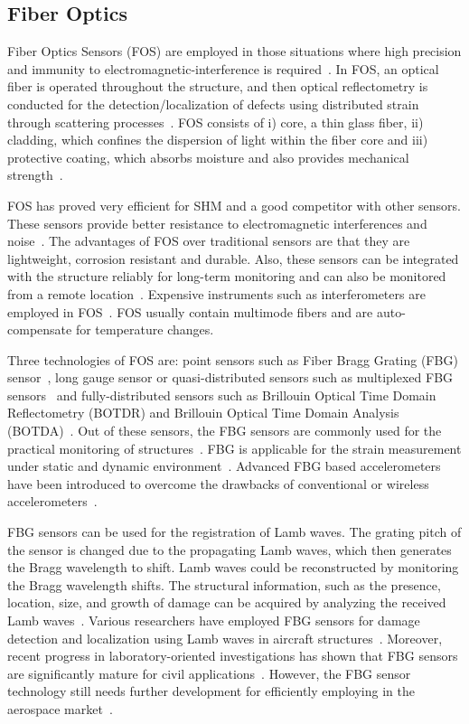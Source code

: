 \documentclass[b5paper, 11pt, titlepage]{book}
\begin{document}
\subsection{Fiber Optics}
Fiber Optics Sensors (FOS) are employed in those situations where high precision and immunity to electromagnetic-interference is required~\cite{li2018fiber}. In FOS, an optical fiber is operated throughout the structure, and then optical reflectometry is conducted for the detection/localization of defects using distributed strain through scattering processes~\cite{warsi2019sensors}. 
FOS consists of i) core, a thin glass fiber, ii) cladding, which confines the dispersion of light within the fiber core and iii) protective coating, which absorbs moisture and also provides mechanical strength~\cite{Torres2011}.

FOS has proved very efficient for SHM and a good competitor with other sensors. These sensors provide better resistance to electromagnetic interferences and noise~\cite{Das2018}. The advantages of FOS over traditional sensors are that they are lightweight, corrosion resistant and durable. Also, these sensors can be integrated with the structure reliably for long-term monitoring and can also be monitored from a remote location~\cite{casas2003fiber, Majumder2008}. Expensive instruments such as interferometers are employed in FOS~\cite{warsi2019sensors}. FOS usually contain multimode fibers and are auto-compensate for temperature changes. 

Three technologies of FOS are: point sensors such as Fiber Bragg Grating (FBG) sensor~\cite{Li2004}, long gauge sensor or quasi-distri\-bu\-ted sensors such as multiplexed FBG sensors~\cite{Delepine-Lesoille2006} and fully-distri\-buted sensors such as Brillouin Optical Time Domain Reflectometry (BOTDR) and Brillouin Optical Time Domain Analysis
(BOTDA)~\cite{bourne2009energy}. Out of these sensors, the FBG sensors are commonly used for the practical monitoring of structures~\cite{Majumder2008}. FBG is applicable for the strain measurement under static and dynamic environment~\cite{jawaid2018structural}. Advanced FBG based accelerometers have been introduced to overcome the drawbacks of conventional or wireless accelerometers~\cite{Majumder2008}. 

FBG sensors can be used for the registration of Lamb waves. The grating pitch of the sensor is changed due to the propagating Lamb waves, which then generates the Bragg wavelength to shift. Lamb waves could be reconstructed by monitoring the Bragg wavelength shifts. The structural information, such as the presence, location, size, and growth of damage can be acquired by analyzing the received Lamb waves~\cite{guo2011fiber}. Various researchers have employed FBG sensors for damage detection and localization using Lamb waves in aircraft structures~\cite{takeda2005development, tsuda2006ultrasound, betz2003lamb, betz2007structural}. Moreover, recent progress in laboratory-oriented investigations has shown that FBG sensors are significantly mature for civil applications~\cite{guo2011fiber, li2004recent}. However, the FBG sensor technology still needs further development for efficiently employing in the aerospace market~\cite{guo2011fiber}.  
\end{document}
